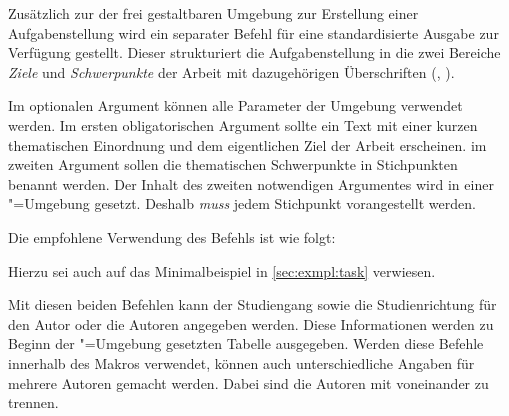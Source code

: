 \begin{Declaration}{\LParameter%
}
\printdeclarationlist%
%
Zusätzlich zur der frei gestaltbaren Umgebung  zur Erstellung
einer Aufgabenstellung wird ein separater Befehl für eine standardisierte 
Ausgabe zur Verfügung gestellt. Dieser strukturiert die Aufgabenstellung in die 
zwei Bereiche \emph{Ziele} und \emph{Schwerpunkte} der Arbeit mit dazugehörigen 
Überschriften (, ).

Im optionalen Argument können alle Parameter der Umgebung  
verwendet werden. Im ersten obligatorischen Argument sollte ein Text mit einer 
kurzen thematischen Einordnung und dem eigentlichen Ziel der Arbeit erscheinen. 
im zweiten Argument sollen die thematischen Schwerpunkte in Stichpunkten 
benannt werden. Der Inhalt des zweiten notwendigen Argumentes wird in einer 
"=Umgebung gesetzt. Deshalb \emph{muss} jedem Stichpunkt 
 vorangestellt werden.
%
\end{Declaration}
%
\begin{Example}
Die empfohlene Verwendung des Befehls  ist wie folgt:
\begin{Code}[escapechar=§]
\end{Code}
Hierzu sei auch auf das Minimalbeispiel in \autoref{sec:exmpl:task} verwiesen.
\end{Example}

\begin{Declaration}{}
\begin{Declaration}{}
\printdeclarationlist%
%
%
Mit diesen beiden Befehlen kann der Studiengang sowie die Studienrichtung für 
den Autor oder die Autoren angegeben werden. Diese Informationen werden zu 
Beginn der "=Umgebung gesetzten Tabelle ausgegeben. Werden 
diese Befehle innerhalb des Makros  verwendet, können auch 
unterschiedliche Angaben für mehrere Autoren gemacht werden. Dabei sind die 
Autoren mit  voneinander zu trennen.
\end{Declaration}
\end{Declaration}

